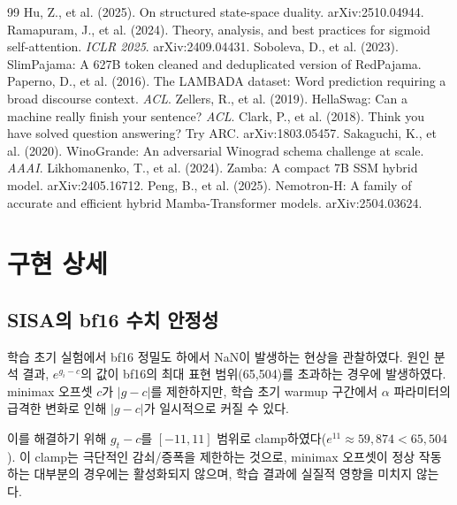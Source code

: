 \documentclass[11pt]{article}
\begin{document}
\begin{thebibliography}{99}
 Hu, Z., et al. (2025). On structured state-space duality. arXiv:2510.04944.
 Ramapuram, J., et al. (2024). Theory, analysis, and best practices for sigmoid self-attention. \emph{ICLR 2025}. arXiv:2409.04431.
 Soboleva, D., et al. (2023). SlimPajama: A 627B token cleaned and deduplicated version of RedPajama.
 Paperno, D., et al. (2016). The LAMBADA dataset: Word prediction requiring a broad discourse context. \emph{ACL}.
 Zellers, R., et al. (2019). HellaSwag: Can a machine really finish your sentence? \emph{ACL}.
 Clark, P., et al. (2018). Think you have solved question answering? Try ARC. arXiv:1803.05457.
 Sakaguchi, K., et al. (2020). WinoGrande: An adversarial Winograd schema challenge at scale. \emph{AAAI}.
 Likhomanenko, T., et al. (2024). Zamba: A compact 7B SSM hybrid model. arXiv:2405.16712.
 Peng, B., et al. (2025). Nemotron-H: A family of accurate and efficient hybrid Mamba-Transformer models. arXiv:2504.03624.
\end{thebibliography}

\appendix
\section{구현 상세}

\subsection{SISA의 bf16 수치 안정성}

학습 초기 실험에서 bf16 정밀도 하에서 NaN이 발생하는 현상을 관찰하였다. 원인 분석 결과, $e^{g_i - c}$의 값이 bf16의 최대 표현 범위(65,504)를 초과하는 경우에 발생하였다. minimax 오프셋 $c$가 $|g - c|$를 제한하지만, 학습 초기 warmup 구간에서 $\alpha$ 파라미터의 급격한 변화로 인해 $|g - c|$가 일시적으로 커질 수 있다.

이를 해결하기 위해 $g_t - c$를 $[-11, 11]$ 범위로 clamp하였다($e^{11} \approx 59,874 < 65,504$). 이 clamp는 극단적인 감쇠/증폭을 제한하는 것으로, minimax 오프셋이 정상 작동하는 대부분의 경우에는 활성화되지 않으며, 학습 결과에 실질적 영향을 미치지 않는다.
\end{document}
